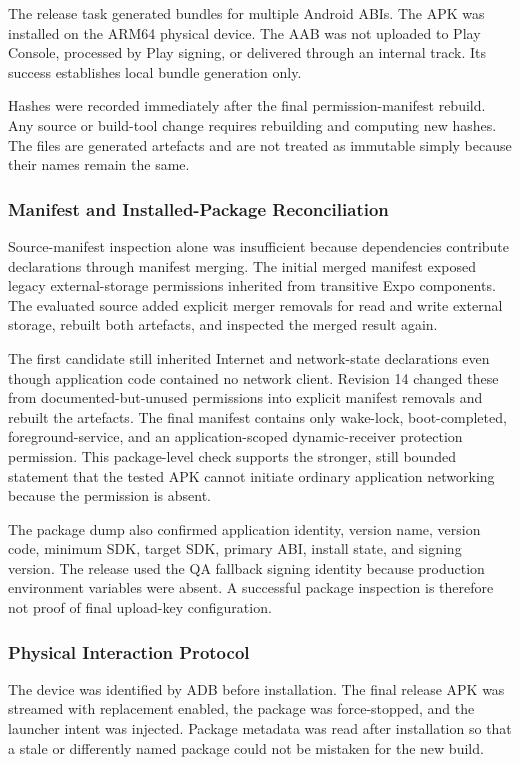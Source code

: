 The release task generated bundles for multiple Android ABIs. The APK was installed on the ARM64 physical device. The AAB was not uploaded to Play Console, processed by Play signing, or delivered through an internal track. Its success establishes local bundle generation only.

Hashes were recorded immediately after the final permission-manifest rebuild. Any source or build-tool change requires rebuilding and computing new hashes. The files are generated artefacts and are not treated as immutable simply because their names remain the same.

\subsubsection{Manifest and Installed-Package Reconciliation}

Source-manifest inspection alone was insufficient because dependencies contribute declarations through manifest merging. The initial merged manifest exposed legacy external-storage permissions inherited from transitive Expo components. The evaluated source added explicit merger removals for read and write external storage, rebuilt both artefacts, and inspected the merged result again.

The first candidate still inherited Internet and network-state declarations even though application code contained no network client. Revision 14 changed these from documented-but-unused permissions into explicit manifest removals and rebuilt the artefacts. The final manifest contains only wake-lock, boot-completed, foreground-service, and an application-scoped dynamic-receiver protection permission. This package-level check supports the stronger, still bounded statement that the tested APK cannot initiate ordinary application networking because the permission is absent.

The package dump also confirmed application identity, version name, version code, minimum SDK, target SDK, primary ABI, install state, and signing version. The release used the QA fallback signing identity because production environment variables were absent. A successful package inspection is therefore not proof of final upload-key configuration.

\subsubsection{Physical Interaction Protocol}

The device was identified by ADB before installation. The final release APK was streamed with replacement enabled, the package was force-stopped, and the launcher intent was injected. Package metadata was read after installation so that a stale or differently named package could not be mistaken for the new build.

